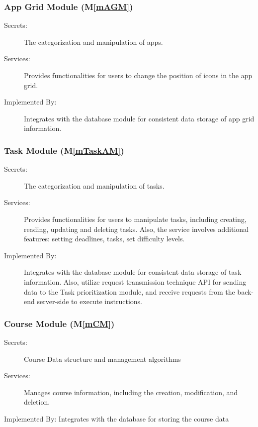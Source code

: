 \documentclass[12pt, titlepage]{article}
\newcommand{\mref}[1]{M\ref{#1}}
\begin{document}
\subsubsection{App Grid Module (\mref{mAGM})}

\begin{description}
\item[Secrets:] The categorization and manipulation of apps.
\item[Services:] Provides functionalities for users to change the position of icons in the app grid.
\item[Implemented By:] Integrates with the database module for consistent data storage of app grid information.
\end{description}

\subsubsection{Task Module (\mref{mTaskAM})}

\begin{description}
\item[Secrets:] The categorization and manipulation of tasks.
\item[Services:] Provides functionalities for users to manipulate tasks, including creating, reading, updating and deleting tasks. Also, the service involves additional features: setting deadlines,  tasks, set difficulty levels. 
\item[Implemented By:] Integrates with the database module for consistent data storage of task information. Also, utilize request transmission technique API for sending data to the Task prioritization module, and receive requests from the back-end server-side to execute instructions.
\end{description}


\subsubsection{Course Module (\mref{mCM})}

\begin{description}
\item[Secrets:]Course Data structure and management algorithms
\item[Services:]Manages course information, including the creation, modification, and deletion.
\item[Implemented By: Integrates with the database for storing the course data] 
\end{description}
\end{document}
